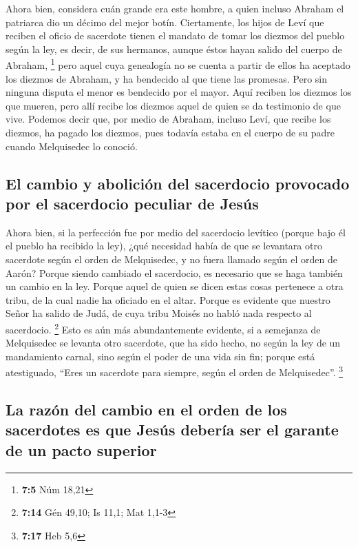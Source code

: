  Ahora bien, considera cuán grande era este hombre, a
quien incluso Abraham el patriarca dio un décimo del mejor botín.
 Ciertamente, los hijos de Leví que reciben el oficio de
sacerdote tienen el mandato de tomar los diezmos del pueblo según la
ley, es decir, de sus hermanos, aunque éstos hayan salido del cuerpo de
Abraham, \footnote{\textbf{7:5} Núm 18,21}  pero aquel
cuya genealogía no se cuenta a partir de ellos ha aceptado los diezmos
de Abraham, y ha bendecido al que tiene las promesas. 
Pero sin ninguna disputa el menor es bendecido por el mayor.
 Aquí reciben los diezmos los que mueren, pero allí recibe
los diezmos aquel de quien se da testimonio de que vive. 
Podemos decir que, por medio de Abraham, incluso Leví, que recibe los
diezmos, ha pagado los diezmos,  pues todavía estaba en
el cuerpo de su padre cuando Melquisedec lo conoció.

\hypertarget{el-cambio-y-aboliciuxf3n-del-sacerdocio-provocado-por-el-sacerdocio-peculiar-de-jesuxfas}{%
\subsection{El cambio y abolición del sacerdocio provocado por el
sacerdocio peculiar de
Jesús}\label{el-cambio-y-aboliciuxf3n-del-sacerdocio-provocado-por-el-sacerdocio-peculiar-de-jesuxfas}}

 Ahora bien, si la perfección fue por medio del
sacerdocio levítico (porque bajo él el pueblo ha recibido la ley), ¿qué
necesidad había de que se levantara otro sacerdote según el orden de
Melquisedec, y no fuera llamado según el orden de Aarón? 
Porque siendo cambiado el sacerdocio, es necesario que se haga también
un cambio en la ley.  Porque aquel de quien se dicen
estas cosas pertenece a otra tribu, de la cual nadie ha oficiado en el
altar.  Porque es evidente que nuestro Señor ha salido de
Judá, de cuya tribu Moisés no habló nada respecto al sacerdocio.
\footnote{\textbf{7:14} Gén 49,10; Is 11,1; Mat 1,1-3} 
Esto es aún más abundantemente evidente, si a semejanza de Melquisedec
se levanta otro sacerdote,  que ha sido hecho, no según
la ley de un mandamiento carnal, sino según el poder de una vida sin
fin;  porque está atestiguado, ``Eres un sacerdote para
siempre, según el orden de Melquisedec''. \footnote{\textbf{7:17} Heb
  5,6}

\hypertarget{la-razuxf3n-del-cambio-en-el-orden-de-los-sacerdotes-es-que-jesuxfas-deberuxeda-ser-el-garante-de-un-pacto-superior}{%
\subsection{La razón del cambio en el orden de los sacerdotes es que
Jesús debería ser el garante de un pacto
superior}\label{la-razuxf3n-del-cambio-en-el-orden-de-los-sacerdotes-es-que-jesuxfas-deberuxeda-ser-el-garante-de-un-pacto-superior}}

